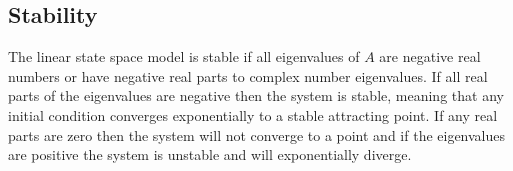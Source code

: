 \subsection{Stability}

The linear state space model is stable if all eigenvalues of $A$ are negative real numbers or have negative real parts to complex number eigenvalues. If all real parts of the eigenvalues are negative then the system is stable, meaning that any initial condition converges exponentially to a stable attracting point. If any real parts are zero then the system will not converge to a point and if the eigenvalues are positive the system is unstable and will exponentially diverge.






